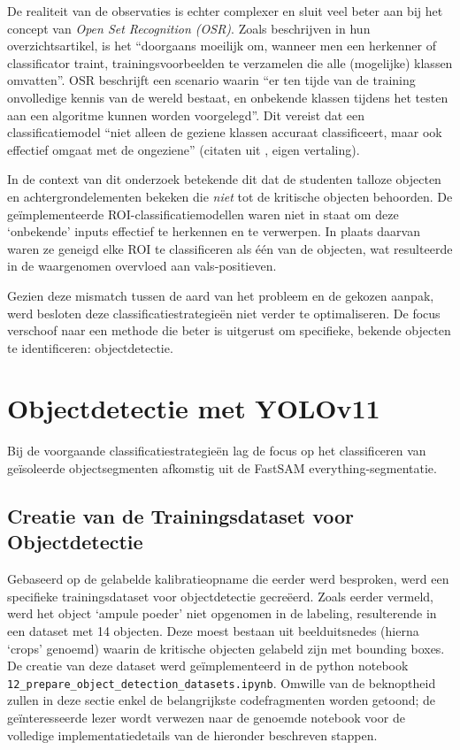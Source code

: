 De realiteit van de observaties is echter complexer en sluit veel beter aan bij het concept van \textit{Open Set Recognition (OSR)}. 
Zoals \textcite{Geng2018} beschrijven in hun overzichtsartikel, is het 
``doorgaans moeilijk om, wanneer men een herkenner of classificator traint, trainingsvoorbeelden te verzamelen die alle (mogelijke) klassen omvatten''.
OSR beschrijft een scenario waarin 
``er ten tijde van de training onvolledige kennis van de wereld bestaat, en onbekende klassen tijdens het testen aan een algoritme kunnen worden voorgelegd''.
Dit vereist dat een classificatiemodel ``niet alleen de geziene klassen accuraat classificeert, maar ook effectief omgaat met de ongeziene'' (citaten uit \textcite{Geng2018}, eigen vertaling).

In de context van dit onderzoek betekende dit dat de studenten talloze objecten en achtergrondelementen bekeken die \textit{niet} tot de kritische objecten behoorden.
De geïmplementeerde ROI-classificatiemodellen waren niet in staat om deze `onbekende' inputs effectief te herkennen en te verwerpen.
In plaats daarvan waren ze geneigd elke ROI te classificeren als één van de objecten, wat resulteerde in de waargenomen overvloed aan vals-positieven.

Gezien deze mismatch tussen de aard van het probleem en de gekozen aanpak, werd besloten deze classificatiestrategieën niet verder te optimaliseren.
De focus verschoof naar een methode die beter is uitgerust om specifieke, bekende objecten te identificeren: objectdetectie.

\section{Objectdetectie met YOLOv11} 

Bij de voorgaande classificatiestrategieën lag de focus op het classificeren van geïsoleerde objectsegmenten afkomstig uit de FastSAM everything-segmentatie.

\subsection{Creatie van de Trainingsdataset voor Objectdetectie}

Gebaseerd op de gelabelde kalibratieopname die eerder werd besproken, werd een specifieke trainingsdataset voor objectdetectie gecreëerd.
Zoals eerder vermeld, werd het object `ampule poeder' niet opgenomen in de labeling, resulterende in een dataset met 14 objecten.
Deze moest bestaan uit beelduitsnedes (hierna `crops' genoemd) waarin de kritische objecten gelabeld zijn met bounding boxes.
De creatie van deze dataset werd geïmplementeerd in de python notebook \texttt{12\_prepare\_object\_detection\_datasets.ipynb}.
Omwille van de beknoptheid zullen in deze sectie enkel de belangrijkste codefragmenten worden getoond; 
de geïnteresseerde lezer wordt verwezen naar de genoemde notebook voor de volledige implementatiedetails van de hieronder beschreven stappen.

